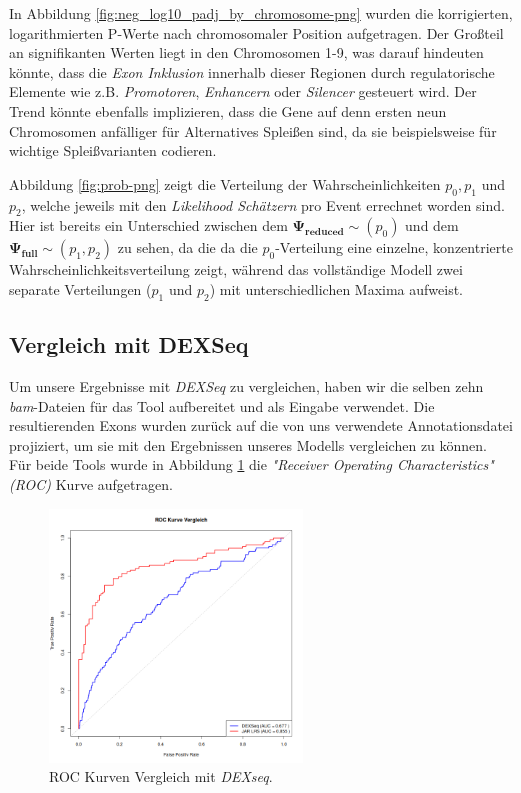 \documentclass[12pt]{article}
\begin{document}
In Abbildung \ref{fig:neg_log10_padj_by_chromosome-png} wurden die korrigierten, logarithmierten P-Werte nach chromosomaler Position
aufgetragen. Der Gro\ss teil an signifikanten Werten liegt in den 
Chromosomen 1-9, was darauf hindeuten könnte, dass die \textit{Exon Inklusion} innerhalb
dieser Regionen durch regulatorische Elemente wie z.B. \textit{Promotoren}, \textit{Enhancern} oder \textit{Silencer}
gesteuert wird. Der Trend könnte ebenfalls implizieren, dass die Gene auf denn ersten 
neun Chromosomen anfälliger für Alternatives Splei\ss en sind, da sie beispielsweise für 
wichtige Splei\ss varianten codieren.

Abbildung \ref{fig:prob-png} zeigt die Verteilung der Wahrscheinlichkeiten $p_{0}, p_{1}$ und $p_{2}$, welche 
jeweils mit den \textit{Likelihood Schätzern} pro Event errechnet worden sind. Hier ist bereits 
ein Unterschied zwischen dem $\mathbf{\Psi_{reduced} \sim }(p_{0})$ und dem $\mathbf{\Psi_{full} \sim} (p_{1}, p_{2})$
zu sehen, da die 
da die $p_{0}$-Verteilung eine einzelne, konzentrierte Wahrscheinlichkeitsverteilung zeigt,
während das vollständige Modell zwei separate Verteilungen ($p_{1}$ und $p_{2}$) mit unterschiedlichen
Maxima aufweist.



\subsection{Vergleich mit DEXSeq}
Um unsere Ergebnisse mit \textit{DEXSeq} zu vergleichen, haben wir die selben zehn
\textit{bam}-Dateien für das Tool aufbereitet und als Eingabe verwendet.
Die resultierenden Exons wurden zurück auf die von uns verwendete Annotationsdatei 
projiziert, um sie mit den Ergebnissen unseres Modells vergleichen zu können.
Für beide Tools wurde in Abbildung \ref{fig:roc_comparison-png} die
\textit{"Receiver Operating Characteristics" (ROC)} Kurve aufgetragen.


\begin{figure}[htpb]
    \centering
    \includegraphics[width=0.6\textwidth]{./plots/roc_comparison.png}
    \caption{ROC Kurven Vergleich mit \textit{DEXseq}.}
    \label{fig:roc_comparison-png}
\end{figure}
\end{document}

